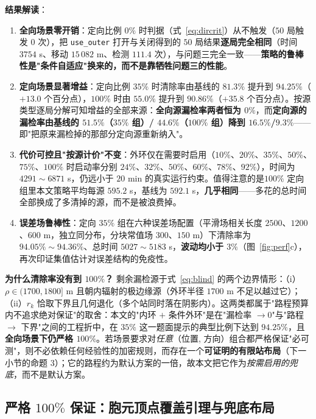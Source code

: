 \noindent\textbf{结果解读}：
\begin{enumerate}
  \item \textbf{全向场景零开销}：定向比例 $0\%$ 时判据（式~\eqref{eq:dircrit}）从不触发（$50$ 局触发 $0$ 次），把 \texttt{use\_outer} 打开与关闭得到的 $50$ 局结果\textbf{逐局完全相同}（时间 $3754$ s、移动 $15\,082$ m、检测 $111.4$ 次），与问题三完全一致——\textbf{策略的鲁棒性是"条件自适应"换来的，而不是靠牺牲问题三的性能}。
  \item \textbf{定向场景显著增益}：定向比例 $35\%$ 时清除率由基线的 $\bm{81.3\%}$ 提升到 $\bm{94.25\%}$（$+13.0$ 个百分点），$100\%$ 时由 $\bm{55.0\%}$ 提升到 $\bm{90.86\%}$（$+35.8$ 个百分点）。按源类型逐局分解可知增益的全部来源：\textbf{全向源漏检率两者恒为 $0\%$}，而\textbf{定向源的漏检率由基线的 $51.5\%$（$35\%$ 组）/ $44.6\%$（$100\%$ 组）降到 $16.5\%$/$9.3\%$}——即"把原来漏检掉的那部分定向源重新纳入"。
  \item \textbf{代价可控且"按源计价"不变}：外环仅在需要时启用（$10\%$、$20\%$、$35\%$、$50\%$、$75\%$、$100\%$ 时启动率分别 $24\%$、$32\%$、$50\%$、$60\%$、$78\%$、$92\%$），时间为 $4291\!\sim\!6871$ s，仍远小于 $20$ min 的真实运行约束。值得注意的是$100\%$ 定向组里本文策略平均每源 $595.2$ s，基线为 $592.1$ s，\textbf{几乎相同}——多花的总时间全部换成了多清掉的源，而不是被浪费掉。
  \item \textbf{误差场鲁棒性}：定向 $35\%$ 组在六种误差场配置（平滑场相关长度 $2500$、$1200$、$600$ m，独立同分布，分块常值场 $300$、$150$ m）下清除率为 $94.05\%\!\sim\!94.36\%$、总时间 $5027\!\sim\!5183$ s，\textbf{波动均小于 $3\%$}（图~\ref{fig:perf}c），再次印证集值估计对误差结构的免疫性。
\end{enumerate}

\noindent\textbf{为什么清除率没有到 $100\%$？} 剩余漏检源于式~\eqref{eq:blind} 的两个边界情形：（i）$\rho\in(1700,1800]$ m 且朝内辐射的极边缘源（外环半径 $1700$ m 不足以越过它）；（ii）$r_k$ 恰取下界且几何退化（多个站同时落在阴影内）。这两类都属于"路程预算内不追求绝对保证"的取舍：本文的"内环 $+$ 条件外环"是在"漏检率 $\to0$"与"路程 $\to$ 下界"之间的工程折中，在 $35\%$ 这一题面提示的典型比例下达到 $94.25\%$，且\textbf{全向场景下仍严格 $100\%$}。若场景要求对\emph{任意}（位置, 方向）组合都严格保证"必可测"，则不必依赖任何经验性的加密规则，而存在一个\textbf{可证明的有限站布局}（下一小节的命题 3）；它的路程约为默认方案的一倍，故本文把它作为\emph{按需启用的兜底}，而不是默认方案。

\subsection{\texorpdfstring{严格 $100\%$ 保证}{严格 100\% 保证}：胞元顶点覆盖引理与兜底布局}
\label{sec:complete}


